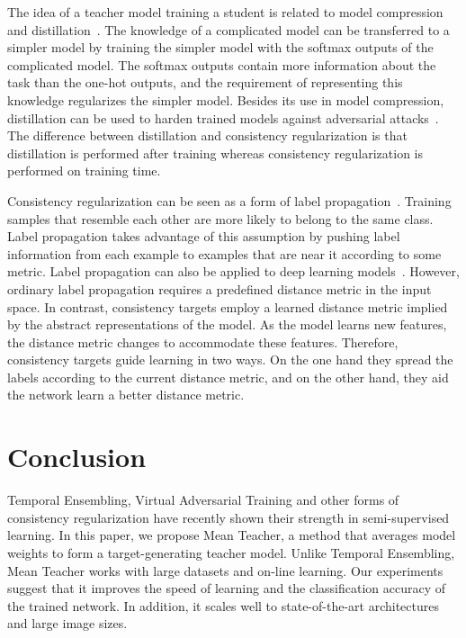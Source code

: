 \documentclass{article}
\begin{document}
The idea of a teacher model training a student is related to model compression~\citep{bucilua_model_2006} and distillation~\citep{hinton_distilling_2015}.
The knowledge of a complicated model can be transferred to a simpler model by training the simpler model with the softmax outputs of the complicated model.
The softmax outputs contain more information about the task than the one-hot outputs, and the requirement of representing this knowledge regularizes the simpler model.
Besides its use in model compression, distillation can be used to harden trained models against adversarial attacks~\citep{papernot_distillation_2015}.
The difference between distillation and consistency regularization is that distillation is performed after training whereas consistency regularization is performed on training time.

Consistency regularization can be seen as a form of label propagation~\citep{zhu_learning_2002}.
Training samples that resemble each other are more likely to belong to the same class.
Label propagation takes advantage of this assumption by pushing label information from each example to examples that are near it according to some metric.
Label propagation can also be applied to deep learning models~\citep{weston_deep_2012}.
However, ordinary label propagation requires a predefined distance metric in the input space.
In contrast, consistency targets employ a learned distance metric implied by the abstract representations of the model.
As the model learns new features, the distance metric changes to accommodate these features.
Therefore, consistency targets guide learning in two ways.
On the one hand they spread the labels according to the current distance metric, and on the other hand, they aid the network learn a better distance metric.

\section{Conclusion}

Temporal Ensembling, Virtual Adversarial Training and other forms of consistency regularization have recently shown their strength in semi-supervised learning.
In this paper, we propose Mean Teacher, a method that averages model weights to form a target-generating teacher model.
Unlike Temporal Ensembling, Mean Teacher works with large datasets and on-line learning.
Our experiments suggest that it improves the speed of learning and the classification accuracy of the trained network.
In addition, it scales well to state-of-the-art architectures and large image sizes.
\end{document}
